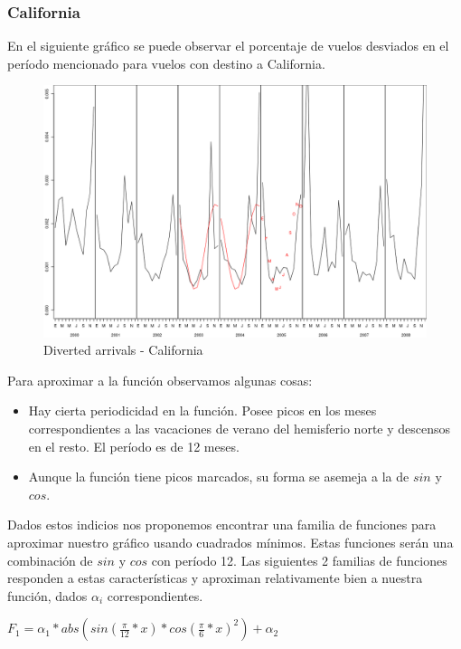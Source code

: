 \documentclass{endm}
\begin{document}
\subsubsection{California}

En el siguiente gr\'afico se puede observar el porcentaje de vuelos desviados en el per\'iodo mencionado para vuelos con destino a California.

\begin{figure}[h!]
  \begin{center}
	\includegraphics[scale=0.4]{img/plot_CA_2003-2005.png}
	\caption{Diverted arrivals - California}
  \end{center}
\end{figure}

Para aproximar a la funci\'on observamos algunas cosas:
\begin{itemize}  
\item Hay cierta periodicidad en la funci\'on. Posee picos en los meses correspondientes a las vacaciones de verano del hemisferio norte y descensos en el resto. El per\'iodo es de 12 meses.
\item Aunque la funci\'on tiene picos marcados, su forma se asemeja a la de $sin$ y $cos$.
\end{itemize}

Dados estos indicios nos proponemos encontrar una familia de funciones para aproximar nuestro gr\'afico usando cuadrados m\'inimos. Estas funciones ser\'an una combinaci\'on de $sin$ y $cos$ con per\'iodo 12. Las siguientes 2 familias de funciones responden a estas caracter\'isticas y aproximan relativamente bien a nuestra funci\'on, dados $\alpha_{i}$ correspondientes.


$F_1 = \alpha_1 * abs(sin(\frac{\pi}{12}*x) * cos(\frac{\pi}{6}*x)^2) + \alpha_2$
\end{document}
